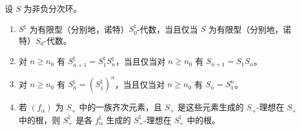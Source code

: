 设 $S$ 为非负分次环。
\begin{enumerate}[label=(\roman*)]
\item $S^{\natural}$ 为有限型（分别地，诺特）$S_0^{\natural}$-代数，当且仅当 $S$ 为有限型（分别地，诺特）$S_0$-代数。
\item 对 $n\geq n_0$ 有 $S_{n+1}^{\natural}=S_1^{\natural}S_n^{\natural}$，当且仅当对 $n\geq n_0$ 有 $S_{n+1}=S_1S_n$。
\item 对 $n\geq n_0$ 有 $S_n^{\natural}=(S_1^{\natural})^n$，当且仅当对 $n\geq n_0$ 有 $S_n=S_1^n$。
\item 若 $(f_\alpha)$ 为 $S_+$ 中的一族齐次元素，且 $S_+$ 是这些元素生成的 $S_+$-理想在 $S_+$ 中的根，则 $S_+^{\natural}$ 是各 $f_\alpha^{\natural}$ 生成的 $S_+^{\natural}$-理想在 $S_+^{\natural}$ 中的根。
\end{enumerate}
